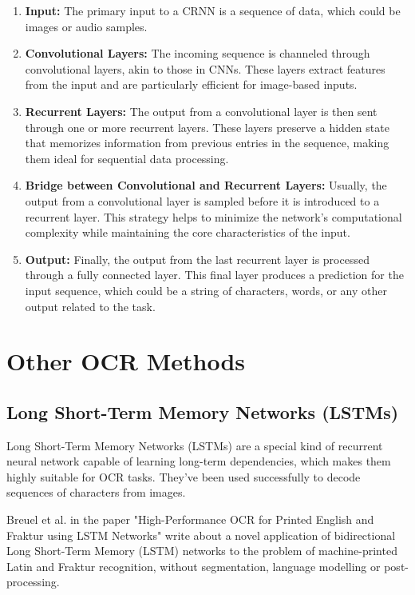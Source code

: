 \begin{enumerate}
    \item \textbf{Input:} The primary input to a CRNN is a sequence of data, which could be images or audio samples.
    \item \textbf{Convolutional Layers:} The incoming sequence is channeled through convolutional layers, akin to those in CNNs. These layers extract features from the input and are particularly efficient for image-based inputs.
    \item \textbf{Recurrent Layers:} The output from a convolutional layer is then sent through one or more recurrent layers. These layers preserve a hidden state that memorizes information from previous entries in the sequence, making them ideal for sequential data processing.
    \item \textbf{Bridge between Convolutional and Recurrent Layers:} Usually, the output from a convolutional layer is sampled before it is introduced to a recurrent layer. This strategy helps to minimize the network's computational complexity while maintaining the core characteristics of the input.
    \item \textbf{Output:} Finally, the output from the last recurrent layer is processed through a fully connected layer. This final layer produces a prediction for the input sequence, which could be a string of characters, words, or any other output related to the task.
\end{enumerate}

\newpage

\section{Other OCR Methods}

\subsection{Long Short-Term Memory Networks (LSTMs)}

Long Short-Term Memory Networks (LSTMs) are a special kind of recurrent neural network capable of learning long-term dependencies, which makes them highly suitable for OCR tasks. They've been used successfully to decode sequences of characters from images.\cite{breuelHighPerformanceOCRPrinted2013}

Breuel et al. in the paper "High-Performance OCR for Printed English and Fraktur using LSTM Networks" write about a novel application of bidirectional Long Short-Term Memory (LSTM) networks to the problem of machine-printed Latin and Fraktur recognition, without segmentation, language modelling or post-processing.

